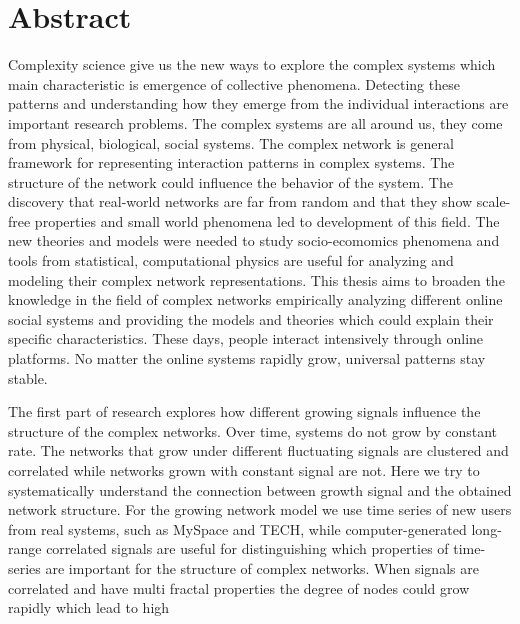 
\normalsize


\chapter*{Abstract}

Complexity science give us the new ways to explore the complex systems which main characteristic is emergence of collective phenomena. Detecting these patterns and understanding how they emerge from the individual interactions are important research problems. The complex systems are all around us, they come from physical, biological, social systems. The complex network is general framework for representing interaction patterns in complex systems. The structure of the network could influence the behavior of the system. The discovery that real-world networks are far from random and that they show scale-free properties and small world phenomena led to development of this field. The new theories and models were needed to study socio-ecomomics phenomena and tools from statistical, computational physics are useful for analyzing and modeling their complex network representations. This thesis aims to broaden the knowledge in the field of complex networks empirically analyzing different online social systems and providing the models and theories which could explain their specific characteristics. These days, people interact intensively through online platforms. No matter the online systems rapidly grow, universal patterns stay stable. 

The first part of research explores how different growing signals influence the structure of the complex networks. Over time, systems do not grow by constant rate. The networks that grow under different fluctuating signals are clustered and correlated while networks grown with constant signal are not. Here we try to systematically understand the connection between growth signal and the obtained network structure. For the growing network model we use time series of new users from real systems, such as MySpace and TECH, while computer-generated long-range correlated signals are useful for distinguishing which properties of time-series are important for the structure of complex networks. When signals are correlated and have multi fractal properties the degree of nodes could grow rapidly which lead to high 

